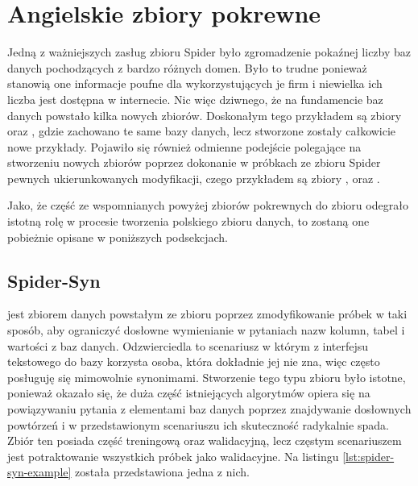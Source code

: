 \section{Angielskie zbiory pokrewne} \label{text:related-datasets}
Jedną z ważniejszych zasług zbioru Spider było zgromadzenie pokaźnej liczby baz danych pochodzących z bardzo różnych domen. Było to trudne ponieważ stanowią one informacje poufne dla wykorzystujących je firm i niewielka ich liczba jest dostępna w internecie. Nic więc dziwnego, że na fundamencie baz danych  powstało kilka nowych zbiorów. Doskonałym tego przykładem są zbiory  oraz , gdzie zachowano te same bazy danych, lecz stworzone zostały całkowicie nowe przykłady. Pojawiło się również odmienne podejście polegające na stworzeniu nowych zbiorów poprzez dokonanie w próbkach ze zbioru Spider pewnych ukierunkowanych modyfikacji, czego przykładem są zbiory ,  oraz .

Jako, że część ze wspomnianych powyżej zbiorów pokrewnych do zbioru  odegrało istotną rolę w procesie tworzenia polskiego zbioru danych, to zostaną one pobieżnie opisane w poniższych podsekcjach.

\subsection{Spider-Syn}
 jest zbiorem danych powstałym ze zbioru  poprzez zmodyfikowanie próbek w taki sposób, aby ograniczyć dosłowne wymienianie w pytaniach nazw kolumn, tabel i wartości z baz danych. Odzwierciedla to scenariusz w którym z interfejsu tekstowego do bazy korzysta osoba, która dokładnie jej nie zna, więc często posługuję się mimowolnie synonimami. Stworzenie tego typu zbioru było istotne, ponieważ okazało się, że duża część istniejących algorytmów opiera się na powiązywaniu pytania z elementami baz danych poprzez znajdywanie dosłownych powtórzeń i w przedstawionym scenariuszu ich skuteczność radykalnie spada. Zbiór ten posiada część treningową oraz walidacyjną, lecz częstym scenariuszem jest potraktowanie wszystkich próbek jako walidacyjne. Na listingu \ref{lst:spider-syn-example} została przedstawiona jedna z nich.

\begin{minipage}{\linewidth}

\end{minipage}

